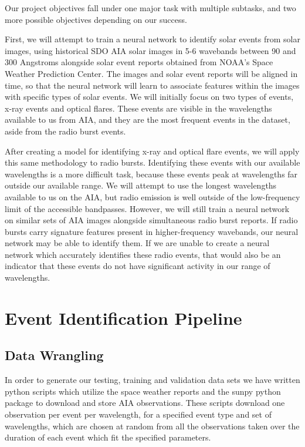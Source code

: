 \documentclass[12pt, letterpaper]{article}
\begin{document}
Our project objectives fall under one major task with multiple subtasks, and two more possible objectives depending on our success.

First, we will attempt to train a neural network to identify solar events from solar images, using historical SDO AIA solar images in 5-6 wavebands between 90 and 300 Angstroms alongside solar event reports obtained from NOAA’s Space Weather Prediction Center. The images and solar event reports will be aligned in time, so that the neural network will learn to associate features within the images with specific types of solar events. We will initially focus on two types of events, x-ray events and optical flares. These events are visible in the wavelengths available to us from AIA, and they are the most frequent events in the dataset, aside from the radio burst events. 

After creating a model for identifying x-ray and optical flare events, we will apply this same methodology to radio bursts. Identifying these events with our available wavelengths is a more difficult task, because these events peak at wavelengths far outside our available range. We will attempt to use the longest wavelengths available to us on the AIA, but radio emission is well outside of the low-frequency limit of the accessible bandpasses. However, we will still train a neural network on similar sets of AIA images alongside simultaneous radio burst reports. If radio bursts carry signature features present in higher-frequency wavebands, our neural network may be able to identify them. If we are unable to create a neural network which accurately identifies these radio events, that would also be an indicator that these events do not have significant activity in our range of wavelengths. 

\section*{Event Identification Pipeline}

\subsection*{Data Wrangling}

In order to generate our testing, training and validation data sets we have written python scripts which utilize the space weather reports and the sunpy python package to download and store AIA observations. These scripts download one observation per event per wavelength, for a specified event type and set of wavelengths, which are chosen at random from all the observations taken over the duration of each event which fit the specified parameters.
\end{document}
